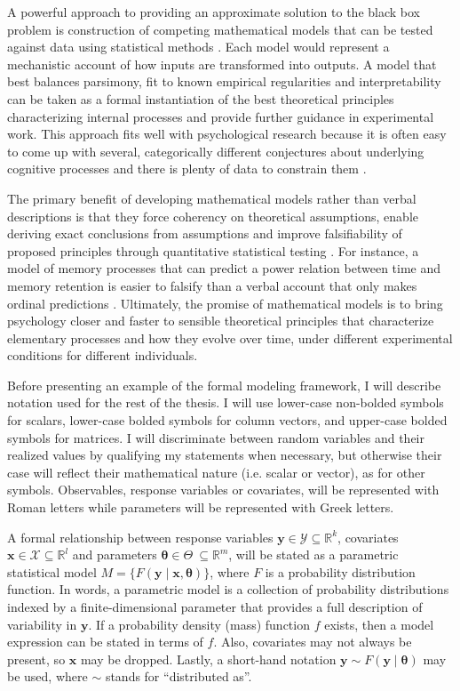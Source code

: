 \documentclass[12pt]{report}
\begin{document}
A powerful approach to providing an approximate solution to the black box problem
is construction of competing mathematical models that can be
tested against data using statistical methods
\citep{Lju1999,Lju2010,CasBer2002,GelCar2013}. Each model would represent a mechanistic account of how inputs are transformed into outputs. A model that best balances
parsimony, fit to known empirical regularities and interpretability can be taken
as a formal instantiation of the best theoretical principles characterizing internal processes and provide further guidance in experimental work. This approach fits well with psychological
research because it is often easy to come up with several, categorically
different conjectures about underlying cognitive processes
\citep{Vic1979,TowAsh1983} and there is plenty of data to constrain them \citep{Luc1986}.

The primary benefit of developing mathematical models rather than verbal descriptions is that they force coherency on theoretical assumptions, enable deriving exact conclusions from assumptions and improve falsifiability of proposed principles through quantitative statistical testing
\citep{Coo1983,BusDie2010,LewFar2010,LeeWag2014}. For instance, a model of memory processes that can
predict a power relation between time and memory retention is easier to falsify than a verbal account that only makes ordinal predictions \citep{CavMyu2013}. Ultimately, the promise of mathematical models is to bring psychology closer and faster to sensible theoretical principles that characterize elementary processes and how they evolve over time, under different
experimental conditions for different individuals.

Before presenting an example of the formal modeling framework, I will describe notation used for the rest of the thesis. I will use lower-case non-bolded symbols for scalars, lower-case bolded symbols for column vectors, and upper-case bolded symbols for matrices. I will discriminate between random variables and their realized values by qualifying my statements when necessary, but otherwise their case will reflect their mathematical nature (i.e. scalar or vector), as for other symbols. Observables, response variables or covariates, will be represented with Roman letters while parameters will be represented with Greek letters.

A formal relationship between response variables $\mathbf{y} \in \mathcal{Y} \subseteq \mathbb{R}^k$, covariates $\mathbf{x} \in \mathcal{X} \subseteq \mathbb{R}^l$ and parameters $\mathbf{\theta} \in \Theta\ \subseteq \mathbb{R}^m$, will be stated as a parametric statistical model $M = \{F(\mathbf{y} \mid \boldsymbol{x}, \boldsymbol{\theta})\}$, where $F$ is a probability distribution function. In words, a parametric model is a collection of probability distributions indexed by a finite-dimensional parameter that provides a full description of variability in $\mathbf{y}$. If a probability density (mass) function $f$ exists, then a model expression can be stated in terms of $f$. Also, covariates may not always be present, so $\mathbf{x}$ may be dropped. Lastly, a short-hand notation $\mathbf{y} \sim F(\mathbf{y} \mid \boldsymbol{\theta})$ may be used, where $\sim$ stands for ``distributed as''.
\end{document}
